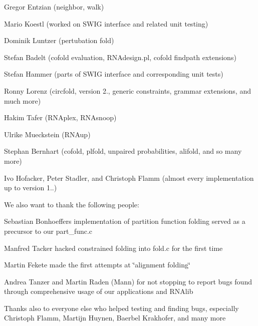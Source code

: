 \begin{DoxyItemize}
\item Gregor Entzian (neighbor, walk)
\item Mario Koestl (worked on S\+W\+IG interface and related unit testing)
\item Dominik Luntzer (pertubation fold)
\item Stefan Badelt (cofold evaluation, R\+N\+Adesign.\+pl, cofold findpath extensions)
\item Stefan Hammer (parts of S\+W\+IG interface and corresponding unit tests)
\item Ronny Lorenz (circfold, version 2., generic constraints, grammar extensions, and much more)
\item Hakim Tafer (R\+N\+Aplex, R\+N\+Asnoop)
\item Ulrike Mueckstein (R\+N\+Aup)
\item Stephan Bernhart (cofold, plfold, unpaired probabilities, alifold, and so many more)
\item Ivo Hofacker, Peter Stadler, and Christoph Flamm (almost every implementation up to version 1..)
\end{DoxyItemize}

We also want to thank the following people\+:


\begin{DoxyItemize}
\item Sebastian Bonhoeffer\textquotesingle{}s implementation of partition function folding served as a precursor to our part\+\_\+func.\+c
\item Manfred Tacker hacked constrained folding into fold.\+c for the first time
\item Martin Fekete made the first attempts at \char`\"{}alignment folding\char`\"{}
\item Andrea Tanzer and Martin Raden (Mann) for not stopping to report bugs found through comprehensive usage of our applications and R\+N\+Alib
\item Thanks also to everyone else who helped testing and finding bugs, especially Christoph Flamm, Martijn Huynen, Baerbel Krakhofer, and many more 
\end{DoxyItemize}

 